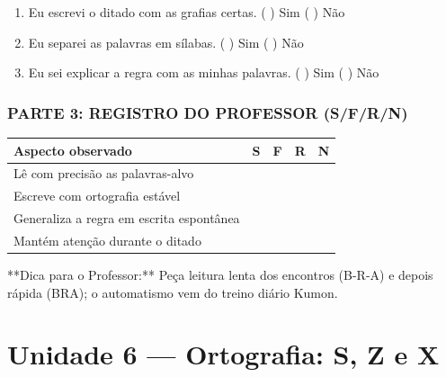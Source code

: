 \begin{exercicio}
\begin{enumerate}[label=\alph*)]
  \item Eu escrevi o ditado com as grafias certas.  \quad ( ) Sim   ( ) Não

  \item Eu separei as palavras em sílabas.  \quad ( ) Sim   ( ) Não

  \item Eu sei explicar a regra com as minhas palavras.  \quad ( ) Sim   ( ) Não

\end{enumerate}

\subsection*{PARTE 3: REGISTRO DO PROFESSOR (S/F/R/N)}

\begin{center}
\renewcommand{\arraystretch}{1.4}
\begin{tabular}{@{}p{9cm}cccc@{}}
\toprule
Aspecto observado & S & F & R & N \\
\midrule
Lê com precisão as palavras-alvo & & & & \\
Escreve com ortografia estável & & & & \\
Generaliza a regra em escrita espontânea & & & & \\
Mantém atenção durante o ditado & & & & \\
\bottomrule\end{tabular}\end{center}

\end{exercicio}

\begin{dica}
**Dica para o Professor:** Peça leitura lenta dos encontros (B-R-A) e depois rápida (BRA); o automatismo vem do treino diário Kumon.
\end{dica}



\chapter{Unidade 6 --- Ortografia: S, Z e X}


